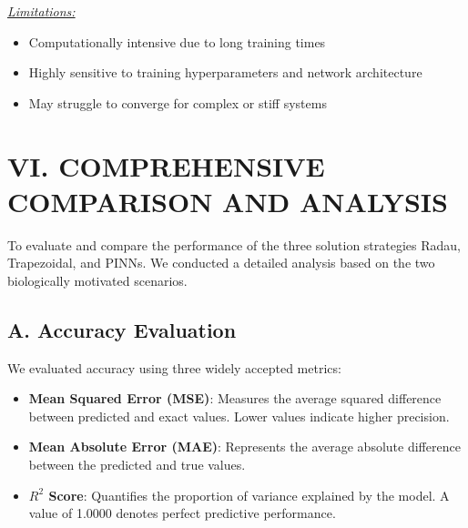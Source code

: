 \documentclass[journal]{IEEEtran}
\begin{document}
\underline{\textit{Limitations:}}
\begin{itemize}
    \item Computationally intensive due to long training times
    \item Highly sensitive to training hyperparameters and network architecture
    \item May struggle to converge for complex or stiff systems
\end{itemize}







\section*{VI. COMPREHENSIVE COMPARISON AND ANALYSIS}

To evaluate and compare the performance of the three solution strategies Radau, Trapezoidal, and PINNs. We conducted a detailed analysis based on the two biologically motivated scenarios.

\subsection*{A. Accuracy Evaluation}

We evaluated accuracy using three widely accepted metrics:
\begin{itemize}
    \item \textbf{Mean Squared Error (MSE)}: Measures the average squared difference between predicted and exact values. Lower values indicate higher precision.
    \item \textbf{Mean Absolute Error (MAE)}: Represents the average absolute difference between the predicted and true values.
    \item \textbf{$R^2$ Score}: Quantifies the proportion of variance explained by the model. A value of 1.0000 denotes perfect predictive performance.
\end{itemize}
\end{document}
